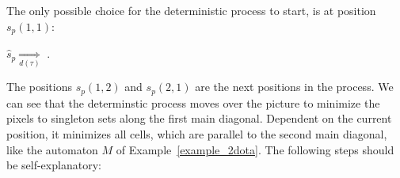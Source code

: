 The only possible choice for the deterministic process to start, is at position $s_p(1, 1)$:
\begin{center}
$\hat{s}_p \underset{d(\tau)}{\Rightarrow}$
.
\end{center}
The positions $s_p(1, 2)$ and $s_p(2, 1)$ are the next positions in the process. We can see that
the determinstic process moves over the picture to minimize the pixels to singleton sets along the
first main diagonal. Dependent on the current position, it minimizes all cells, which are parallel
to the second main diagonal, like the automaton $M$ of Example~\ref{example_2dota}. The following steps
should be self-explanatory:
